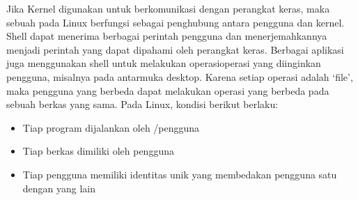\documentclass[letterpaper,10pt,english]{sphinxmanual}
\begin{document}
Jika Kernel digunakan untuk berkomunikasi dengan perangkat keras, maka sebuah  pada Linux berfungsi sebagai penghubung antara pengguna dan kernel. Shell dapat menerima berbagai perintah pengguna dan menerjemahkannya menjadi perintah yang dapat dipahami oleh perangkat keras. Berbagai aplikasi juga menggunakan shell untuk melakukan operasi\sphinxhyphen{}operasi yang diinginkan pengguna, misalnya pada antarmuka desktop. Karena setiap operasi adalah ‘file’, maka pengguna yang berbeda dapat melakukan operasi yang berbeda pada sebuah berkas yang sama. Pada Linux, kondisi berikut berlaku:
\begin{itemize}
\item {} 
Tiap program dijalankan oleh /pengguna

\item {} 
Tiap berkas dimiliki oleh pengguna

\item {} 
Tiap pengguna memiliki identitas unik yang membedakan pengguna satu dengan yang lain

\end{itemize}
\end{document}
